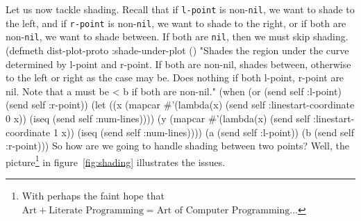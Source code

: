 \nwendcode{}\nwdocspar

Let us now tackle shading. Recall that if {\tt{}l-point} is non-{\tt{}nil},
we want to shade to the left, and if {\tt{}r-point} is non-{\tt{}nil}, we
want to shade to the right, or if both are non-{\tt{}nil}, we want to
shade between. If both are {\tt{}nil}, then we must skip shading.
\nwenddocs{}\plusendmoddef
(defmeth dist-plot-proto :shade-under-plot ()
  "Shades the region under the curve determined by l-point and r-point.
If both are non-nil, shades between, otherwise to the left or right
as the case may be. Does nothing if both l-point, r-point are
nil. Note that a must be < b if both are non-nil."
  (when (or (send self :l-point) (send self :r-point))
     (let ((x (mapcar #'(lambda(x) (send self :linestart-coordinate 0 x))
                      (iseq (send self :num-lines))))
           (y (mapcar #'(lambda(x) (send self :linestart-coordinate 1 x))
                        (iseq (send self :num-lines))))
           (a (send self :l-point))
           (b (send self :r-point)))
\nwendcode{}\nwdocspar
So how are we going to handle shading between two points? Well, the
picture\footnote{With perhaps the faint hope that $\mbox{Art} +
  \mbox{Literate Programming} = \mbox{Art of Computer Programming}\ldots$}
in figure~\ref{fig:shading} illustrates the issues.

